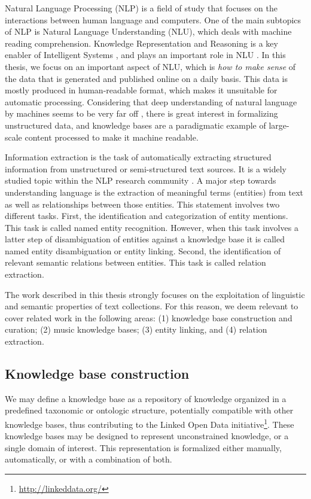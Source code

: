 Natural Language Processing (NLP) is a field of study that focuses on the interactions between human language and computers. One of the main subtopics of NLP is Natural Language Understanding (NLU), which deals with machine reading comprehension.
Knowledge Representation and Reasoning is a key enabler of Intelligent Systems \citep{Suchaneketal2007}, and plays an important role in NLU \citep{BaralandDeGiacomo2015}.
In this thesis, we focus on an important aspect of NLU, which is \textit{how to make sense} of the data that is generated and published online on a daily basis. This data is mostly produced in human-readable format, which makes it unsuitable for automatic processing. Considering that deep understanding of natural language by machines seems to be very far off \citep{CambriaandWhite2014}, there is great interest in formalizing unstructured data, and knowledge bases are a paradigmatic example of large-scale content processed to make it machine readable.

Information extraction is the task of automatically extracting structured information from unstructured or semi-structured text sources. It is a widely studied topic within the NLP research community \citep{cowie1996information}.
A major step towards understanding language is the extraction of meaningful terms (entities) from text as well as relationships between those entities. This statement involves two different tasks. First, the identification and categorization of entity mentions. This task is called named entity recognition. However, when this task involves a latter step of disambiguation of entities against a knowledge base it is called named entity disambiguation or entity linking. Second, the identification of relevant semantic relations between entities. This task is called relation extraction.

The work described in this thesis strongly focuses on the exploitation of linguistic and semantic properties of text collections. For this reason, we deem relevant to cover related work in the following areas: (1) knowledge base construction and curation; (2) music knowledge bases; (3) entity linking, and (4) relation extraction.


\subsection{Knowledge base construction}
\label{sec:SOA:nlu:kbs}

We may define a knowledge base as a repository of knowledge organized in a predefined taxonomic or ontologic structure, potentially compatible with other knowledge bases, thus contributing to the Linked Open Data initiative\footnote{\url{http://linkeddata.org/}}. These knowledge bases may be designed to represent unconstrained knowledge, or a single domain of interest. This representation is formalized either manually, automatically, or with a combination of both.

